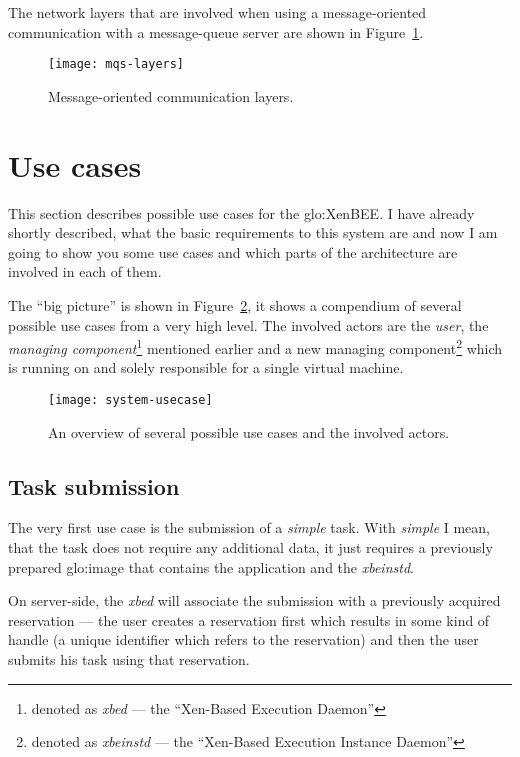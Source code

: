 The  network  layers  that  are  involved when  using  a  message-oriented
communication    with    a    message-queue    server   are    shown    in
Figure~\ref{fig:mqs-layers}.

\begin{figure}[htbp]
  \centering
  \texttt{[image: mqs-layers]}
  \caption[Message Layers]{Message-oriented communication layers.}
  \label{fig:mqs-layers}
\end{figure}


\section{Use cases}
\label{sec:use-cases}

This section describes possible use cases for the \gls{glo:XenBEE}. I have
already shortly described, what the  basic requirements to this system are
and now  I am  going to show  you some  use cases and  which parts  of the
architecture are involved in each of them.

The ``big picture'' is shown in Figure~\ref{fig:system-usecases}, it shows
a compendium  of several possible  use cases from  a very high  level. The
involved    actors    are     the    \emph{user},    the    \emph{managing
  component}\footnote{denoted as \emph{xbed} --- the ``Xen-Based Execution
  Daemon''}     mentioned      earlier     and     a      new     managing
component\footnote{denoted   as   \emph{xbeinstd}   ---  the   ``Xen-Based
  Execution Instance Daemon''} which  is running on and solely responsible
for a single virtual machine.

\begin{figure}[htbp]
  \centering
  \texttt{[image: system-usecase]}
  \caption[Use case  overview]{An overview  of several possible  use cases
    and the involved actors.}
  \label{fig:system-usecases}
\end{figure}

\subsection{Task submission}
\label{sec:uc-task-submission}

The very  first use case is  the submission of a  \emph{simple} task. With
\emph{simple} I mean, that the  task does not require any additional data,
it just  requires a previously prepared \gls{glo:image}  that contains the
application and the \emph{xbeinstd}.

On  server-side, the  \emph{xbed}  will associate  the  submission with  a
previously acquired  reservation ---  \ie the user creates  a reservation
first  which results in  some kind  of handle  (a unique  identifier which
refers to the  reservation) and then the user submits  his task using that
reservation.

